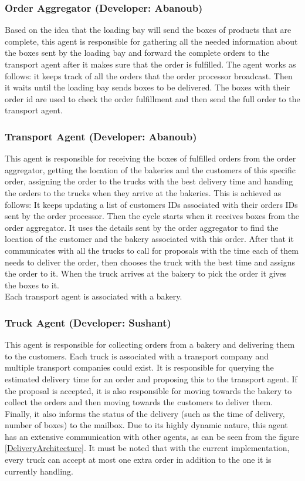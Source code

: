 \documentclass[11pt, a4paper]{article}
\begin{document}
\subsubsection{Order Aggregator (Developer: Abanoub)}
Based on the idea that the loading bay will send the boxes of products that are complete, this agent is responsible for gathering all the needed information about the boxes sent by the loading bay and forward the complete orders to the transport agent after it makes sure that the order is fulfilled. The agent works as follows: it keeps track of all the orders that the order processor broadcast. Then it waits until the loading bay sends boxes to be delivered. The boxes with their order id are used to check the order fulfillment and then send the full order to the transport agent.

\subsubsection{Transport Agent (Developer: Abanoub)}
This agent is responsible for receiving the boxes of fulfilled orders from the order aggregator, getting the location of the bakeries and the customers of this specific order, assigning the order to the trucks with the best delivery time and handing the orders to the trucks when they arrive at the bakeries. This is achieved as follows: It keeps updating a list of customers IDs associated with their orders IDs sent by the order processor. Then the cycle starts when it receives boxes from the order aggregator. It uses the details sent by the order aggregator to find the location of the customer and the bakery associated with this order. After that it communicates with all the trucks to call for proposals with the time each of them needs to deliver the order, then chooses the truck with the best time and assigns the order to it. When the truck arrives at the bakery to pick the order it gives the boxes to it.\\
Each transport agent is associated with a bakery.
\subsubsection{Truck Agent (Developer: Sushant)}
This agent is responsible for collecting orders from a bakery and delivering them to the customers. Each truck is associated with a transport company and multiple transport companies could exist. It is responsible for querying the estimated delivery time for an order and proposing this to the transport agent. If the proposal is accepted, it is also responsible for moving towards the bakery to collect the orders and then moving towards the customers to deliver them. Finally, it also informs the status of the delivery (such as the time of delivery, number of boxes) to the mailbox. Due to its highly dynamic nature, this agent has an extensive communication with other agents, as can be seen from the figure \ref{DeliveryArchitecture}. It must be noted that with the current implementation, every truck can accept at most one extra order in addition to the one it is currently handling. 
	
\end{document}
